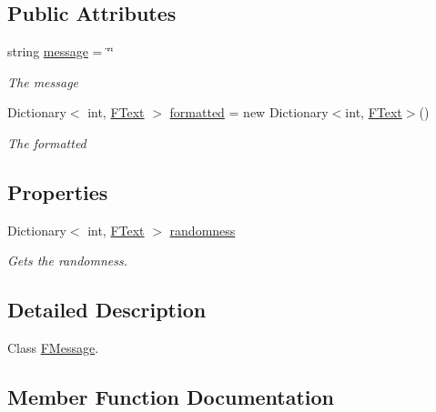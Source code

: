 \subsection*{Public Attributes}
\begin{DoxyCompactItemize}
\item 
string \hyperlink{class_lerp2_a_p_i_1_1_game_1_1_game_console_1_1_f_message_aae4d078162de0b5a2b28bd036562f40e}{message} = \char`\"{}\char`\"{}
\begin{DoxyCompactList}\small\item\em The message \end{DoxyCompactList}\item 
Dictionary$<$ int, \hyperlink{class_lerp2_a_p_i_1_1_game_1_1_game_console_1_1_f_text}{F\+Text} $>$ \hyperlink{class_lerp2_a_p_i_1_1_game_1_1_game_console_1_1_f_message_acc464c0f449366c179a9d8791942d406}{formatted} = new Dictionary$<$int, \hyperlink{class_lerp2_a_p_i_1_1_game_1_1_game_console_1_1_f_text}{F\+Text}$>$()
\begin{DoxyCompactList}\small\item\em The formatted \end{DoxyCompactList}\end{DoxyCompactItemize}
\subsection*{Properties}
\begin{DoxyCompactItemize}
\item 
Dictionary$<$ int, \hyperlink{class_lerp2_a_p_i_1_1_game_1_1_game_console_1_1_f_text}{F\+Text} $>$ \hyperlink{class_lerp2_a_p_i_1_1_game_1_1_game_console_1_1_f_message_a470a5c18be28b088e3606cd52d9b80b8}{randomness}
\begin{DoxyCompactList}\small\item\em Gets the randomness. \end{DoxyCompactList}\end{DoxyCompactItemize}


\subsection{Detailed Description}
Class \hyperlink{class_lerp2_a_p_i_1_1_game_1_1_game_console_1_1_f_message}{F\+Message}. 



\subsection{Member Function Documentation}
\mbox{\label{class_lerp2_a_p_i_1_1_game_1_1_game_console_1_1_f_message_ae81eca15974b18adbb7938d76b35a834}} 
